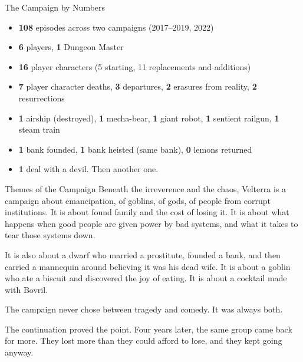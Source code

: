 \begin{DndComment}{The Campaign by Numbers}
\begin{itemize}
  \item \textbf{108} episodes across two campaigns (2017--2019, 2022)
  \item \textbf{6} players, \textbf{1} Dungeon Master
  \item \textbf{16} player characters (5 starting, 11 replacements and additions)
  \item \textbf{7} player character deaths, \textbf{3} departures, \textbf{2} erasures from reality, \textbf{2} resurrections
  \item \textbf{1} airship (destroyed), \textbf{1} mecha-bear, \textbf{1} giant robot, \textbf{1} sentient railgun, \textbf{1} steam train
  \item \textbf{1} bank founded, \textbf{1} bank heisted (same bank), \textbf{0} lemons returned
  \item \textbf{1} deal with a devil.  Then another one.
\end{itemize}
\end{DndComment}

\begin{DndSidebar}{Themes of the Campaign}
Beneath the irreverence and the chaos, Velterra is a campaign about emancipation, of goblins, of gods, of people from corrupt institutions.  It is about found family and the cost of losing it.  It is about what happens when good people are given power by bad systems, and what it takes to tear those systems down.

It is also about a dwarf who married a prostitute, founded a bank, and then carried a mannequin around believing it was his dead wife.  It is about a goblin who ate a biscuit and discovered the joy of eating.  It is about a cocktail made with Bovril.

The campaign never chose between tragedy and comedy.  It was always both.

The continuation proved the point.  Four years later, the same group came back for more.  They lost more than they could afford to lose, and they kept going anyway.
\end{DndSidebar}

\clearpage
